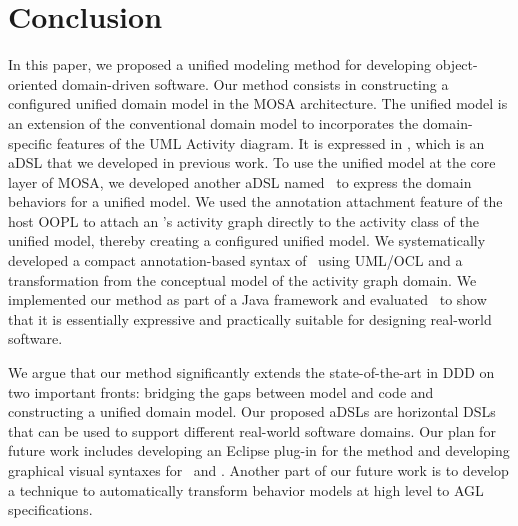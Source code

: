 %
\section{Conclusion}\label{sect:conclusion} %
In this paper, we proposed a unified modeling method for developing object-oriented domain-driven software. Our method consists in constructing a configured unified domain model in the MOSA architecture. The unified model is an extension of the conventional domain model to incorporates the domain-specific features of the UML Activity diagram. It is expressed in \dcsl, which is an aDSL that we developed in previous work. To use the unified model at the core layer of MOSA, we developed another aDSL named \agl~to express the domain behaviors for a unified model. We used the annotation attachment feature of the host OOPL to attach an \agl's activity graph directly to the activity class of the unified model, thereby creating a configured unified model.
We systematically developed a compact annotation-based syntax of \agl~using UML/OCL and a transformation from the conceptual model of the activity graph domain.
%
We implemented our method as part of a Java framework and evaluated \agl~to show that it is essentially expressive and practically suitable for designing real-world software. 

We argue that our method significantly extends the state-of-the-art in DDD on two important fronts: bridging the gaps between model and code and constructing a unified domain model. Our proposed aDSLs are horizontal DSLs that can be used to support different real-world software domains.
%
Our plan for future work includes
developing an Eclipse plug-in for the method and developing graphical visual syntaxes for \dcsl~and \agl. Another part of our future work is to develop a technique to automatically transform behavior models at high level to AGL specifications. 
